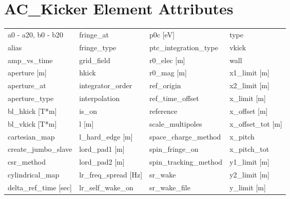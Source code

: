  \section{AC_Kicker Element Attributes}
 \label{s:list.ac.kicker}

 \begin{tabular}{llll} \toprule
a0 - a20, b0 - b20             & fringe_at                      & p0c [eV]                       & type                           \\
alias                          & fringe_type                    & ptc_integration_type           & vkick                          \\
amp_vs_time                    & grid_field                     & r0_elec [m]                    & wall                           \\
aperture [m]                   & hkick                          & r0_mag [m]                     & x1_limit [m]                   \\
aperture_at                    & integrator_order               & ref_origin                     & x2_limit [m]                   \\
aperture_type                  & interpolation                  & ref_time_offset                & x_limit [m]                    \\
bl_hkick [T*m]                 & is_on                          & reference                      & x_offset [m]                   \\
bl_vkick [T*m]                 & l [m]                          & scale_multipoles               & x_offset_tot [m]               \\
cartesian_map                  & l_hard_edge [m]                & space_charge_method            & x_pitch                        \\
create_jumbo_slave             & lord_pad1 [m]                  & spin_fringe_on                 & x_pitch_tot                    \\
csr_method                     & lord_pad2 [m]                  & spin_tracking_method           & y1_limit [m]                   \\
cylindrical_map                & lr_freq_spread [Hz]            & sr_wake                        & y2_limit [m]                   \\
delta_ref_time [sec]           & lr_self_wake_on                & sr_wake_file                   & y_limit [m]                    \\

\end{tabular}
